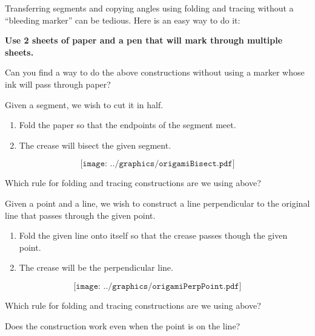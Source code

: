 Transferring segments and copying angles using folding and tracing without a
``bleeding marker'' can be tedious. Here is an easy way to do it: 
\begin{center}
\textbf{Use 2 sheets of paper and a pen that will mark through multiple
sheets.}
\end{center}

\begin{question} 
Can you find a way to do the above constructions without using a
marker whose ink will pass through paper?
\end{question}
\QM

\begin{construction} 
Given a segment, we wish to cut it in half.
\begin{enumerate}
\item Fold the paper so that the endpoints of the segment meet.
\item The crease will bisect the given segment.
\end{enumerate}
\[
\texttt{[image: ../graphics/origamiBisect.pdf]}
\]
\end{construction}

\begin{question} 
Which rule for folding and tracing constructions are we using above?
\end{question}
\QM


\begin{construction}  
Given a point and a line, we wish to construct a line perpendicular to
the original line that passes through the given point.
\begin{enumerate}
\item Fold the given line onto itself so that the crease passes though
  the given point.
\item The crease will be the perpendicular line.
\end{enumerate}
\[
\texttt{[image: ../graphics/origamiPerpPoint.pdf]}
\]
\end{construction}


\begin{question} Which rule for folding and tracing constructions are we using above?
\end{question}
\QM

\begin{question} Does the construction work even when the point is on the line?
\end{question}
\QM



